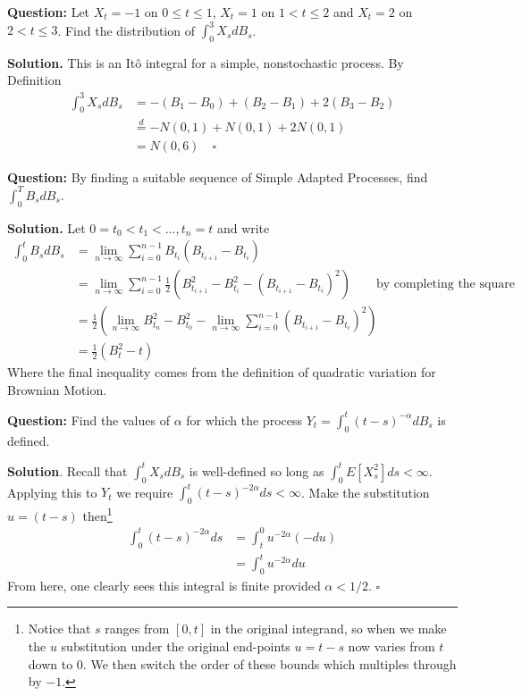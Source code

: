 \documentclass{article}
\begin{document}
\begin{tcolorbox}[colframe=black,colback=gray!5,boxrule=0.5pt]
\textbf{Question:} Let $X_t=-1$ on $0\leq t\leq1$, $X_t=1$ on $1 < t\leq2$ and $X_t=2$ on $2 < t\leq3$. Find the distribution of $\int_0^3X_sdB_s$. \cite{Fima}
\end{tcolorbox}
\textbf{Solution.} This is an Itô integral for a simple, nonstochastic process. By Definition
\begin{align*}
    \int_0^3 X_sdB_s &= -(B_1-B_0) + (B_2-B_1)+2(B_3-B_2) \\ 
    &\stackrel{d}={-N(0,1) + N(0,1) + 2N(0,1)} \\
    & = N(0,6) \quad \square
\end{align*}



\begin{tcolorbox}[colframe=black,colback=gray!5,boxrule=0.5pt]
\textbf{Question:} By finding a suitable sequence of Simple Adapted Processes, find $\int_0^T B_s dB_s$. \cite{Fima}
\end{tcolorbox}
\textbf{Solution.} Let $0=t_0<t_1<\dots,t_n=t$ and write
\begin{align*}
    \int_0^tB_sdB_s &= \lim_{n\to\infty}\sum_{i=0}^{n-1}B_{t_i}(B_{t_{i+1}} - B_{t_i}) \\
    &= \lim_{n\to\infty}\sum_{i=0}^{n-1}\frac{1}{2}(B_{t_{i+1}}^2 - B_{t_i}^2 - (B_{t_{i+1}} - B_{t_i})^2) \quad\quad \text{by completing the square} \\
    &= \frac{1}{2}\left(\lim_{n\to\infty}B_{t_{n}}^2 - B_{t_0}^2 - \lim_{n\to\infty}\sum_{i=0}^{n-1}(B_{t_{i+1}} - B_{t_i})^2\right) \\
    &= \frac{1}{2}(B_t^2-t)
\end{align*}
Where the final inequality comes from the definition of quadratic variation for Brownian Motion. 


\begin{tcolorbox}[colframe=black,colback=gray!5,boxrule=0.5pt]
\textbf{Question:} Find the values of $\alpha$ for which the process $Y_t = \int_0^t(t-s)^{-\alpha}dB_s$ is defined.
\end{tcolorbox}
\textbf{Solution}. Recall that $\int_0^t X_sdB_s$ is well-defined so long as $\int_0^t E[X_s^2]ds<\infty$. Applying this to $Y_t$ we require $\int_0^t(t-s)^{-2\alpha}ds <\infty$. Make the substitution $u = (t-s)$ then\footnote{Notice that $s$ ranges from $[0,t]$ in the original integrand, so when we make the $u$ substitution under the original end-points $u = t-s$ now varies from $t$ down to $0$. We then switch the order of these bounds which multiples through by $-1$.}
\begin{align*}
    \int_0^t(t-s)^{-2\alpha}ds &= \int_t^0 u^{-2\alpha}(-du) \\
    &= \int_0^tu^{-2\alpha}du
\end{align*}
From here, one clearly sees this integral is finite provided $\alpha < 1/2.$ $\square$
\end{document}
